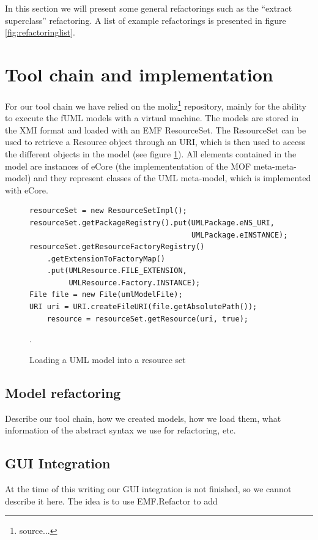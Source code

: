 \documentclass{llncs}
\begin{document}
In this section we will present some general refactorings such as the ``extract superclass'' refactoring. A list of example refactorings
is presented in figure \ref{fig:refactoringlist}.

\section{Tool chain and implementation}
For our tool chain we have relied on the moliz\footnote{source...} repository, mainly for the ability to execute the fUML 
models with a virtual machine. The models are stored in the XMI format and loaded with an EMF ResourceSet. The ResourceSet
can be used to retrieve a Resource object through an URI, which is then used to access the different objects in the model 
(see figure \ref{lst:resourceset}). All elements contained in the model are instances of eCore (the implemententation of 
the MOF meta-meta-model) and they represent classes of the UML meta-model, which is implemented with eCore.

\begin{figure}
 \begin{lstlisting}
resourceSet = new ResourceSetImpl();
resourceSet.getPackageRegistry().put(UMLPackage.eNS_URI,
                                     UMLPackage.eINSTANCE);
resourceSet.getResourceFactoryRegistry()
    .getExtensionToFactoryMap()
    .put(UMLResource.FILE_EXTENSION,
         UMLResource.Factory.INSTANCE);
File file = new File(umlModelFile);
URI uri = URI.createFileURI(file.getAbsolutePath());
    resource = resourceSet.getResource(uri, true);
 \end{lstlisting}
 \caption{Loading a UML model into a resource set}.
 \label{lst:resourceset}
\end{figure}





\subsection{Model refactoring}
Describe our tool chain, how we created models, how we load them, what information of the abstract syntax we use for refactoring, etc.

\subsection{GUI Integration}
At the time of this writing our GUI integration is not finished, so we cannot describe it here. The idea is to use EMF.Refactor to add 
\end{document}
